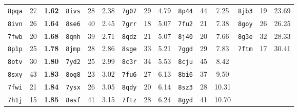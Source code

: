 \begin{table}[h]
{\begin{tabular}{lcc@{\hskip 4pt}|@{\hskip 4pt}lcc@{\hskip 4pt}|@{\hskip 4pt}lcc@{\hskip 4pt}|@{\hskip 4pt}lcc@{\hskip 4pt}|@{\hskip 4pt}lcc}
\texttt{8pqa} & 27 & \textbf{1.62} & \texttt{8ivs} & 28 & 2.38 & \texttt{7g07} & 29 & 4.79 & \texttt{8p44} & 44 & 7.25 & \texttt{8jb3} & 19 & 23.69 \\
\texttt{8ivn} & 26 & \textbf{1.64} & \texttt{8se6} & 40 & 2.45 & \texttt{7grr} & 18 & 5.07 & \texttt{7fu2} & 21 & 7.38 & \texttt{8goy} & 26 & 26.25 \\
\texttt{7fwb} & 20 & \textbf{1.68} & \texttt{8qnh} & 39 & 2.71 & \texttt{8qdz} & 21 & 5.07 & \texttt{8j40} & 20 & 7.66 & \texttt{8g3e} & 32 & 28.33 \\
\texttt{8p1p} & 25 & \textbf{1.78} & \texttt{8jmp} & 28 & 2.86 & \texttt{8sge} & 33 & 5.21 & \texttt{7ggd} & 29 & 7.83 & \texttt{7ftm} & 17 & 30.41 \\
\texttt{8otv} & 30 & \textbf{1.80} & \texttt{7yd2} & 25 & 2.99 & \texttt{8c3r} & 34 & 5.53 & \texttt{8cju} & 45 & 8.42 &  & &  \\
\texttt{8sxy} & 43 & \textbf{1.83} & \texttt{8og8} & 23 & 3.02 & \texttt{7fu6} & 27 & 6.13 & \texttt{8bi6} & 37 & 9.50 &  & &  \\
\texttt{7fwi} & 21 & \textbf{1.84} & \texttt{7ysx} & 26 & 3.05 & \texttt{8qdy} & 20 & 6.14 & \texttt{8sz3} & 28 & 10.31 &  & &  \\
\texttt{7h1j} & 15 & \textbf{1.85} & \texttt{8asf} & 41 & 3.15 & \texttt{7ftz} & 28 & 6.24 & \texttt{8gyd} & 41 & 10.70 &  & &  \\
\bottomrule
\end{tabular}}
\end{table}
